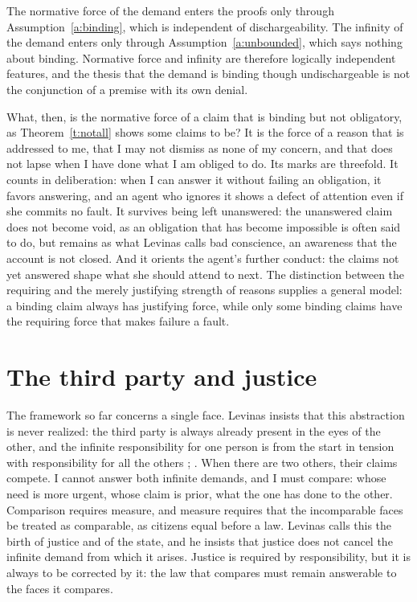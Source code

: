 \documentclass{situationist-preprint}
\begin{document}
\begin{remark}\label{r:independence}
The normative force of the demand enters the proofs only through Assumption~\ref{a:binding}, which is independent of dischargeability. The infinity of the demand enters only through Assumption~\ref{a:unbounded}, which says nothing about binding. Normative force and infinity are therefore logically independent features, and the thesis that the demand is binding though undischargeable is not the conjunction of a premise with its own denial.
\end{remark}

What, then, is the normative force of a claim that is binding but not obligatory, as Theorem~\ref{t:notall} shows some claims to be? It is the force of a reason that is addressed to me, that I may not dismiss as none of my concern, and that does not lapse when I have done what I am obliged to do. Its marks are threefold. It counts in deliberation: when I can answer it without failing an obligation, it favors answering, and an agent who ignores it shows a defect of attention even if she commits no fault. It survives being left unanswered: the unanswered claim does not become void, as an obligation that has become impossible is often said to do, but remains as what Levinas calls bad conscience, an awareness that the account is not closed. And it orients the agent's further conduct: the claims not yet answered shape what she should attend to next. The distinction between the requiring and the merely justifying strength of reasons \citep{Gert2004} supplies a general model: a binding claim always has justifying force, while only some binding claims have the requiring force that makes failure a fault.

\section{The third party and justice}\label{s:third}

The framework so far concerns a single face. Levinas insists that this abstraction is never realized: the third party is always already present in the eyes of the other, and the infinite responsibility for one person is from the start in tension with responsibility for all the others \citep[V.3]{Levinas1974}; \citep{Levinas1996}. When there are two others, their claims compete. I cannot answer both infinite demands, and I must compare: whose need is more urgent, whose claim is prior, what the one has done to the other. Comparison requires measure, and measure requires that the incomparable faces be treated as comparable, as citizens equal before a law. Levinas calls this the birth of justice and of the state, and he insists that justice does not cancel the infinite demand from which it arises. Justice is required by responsibility, but it is always to be corrected by it: the law that compares must remain answerable to the faces it compares.
\end{document}
